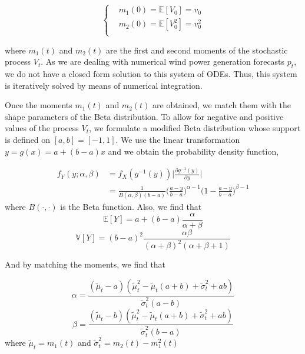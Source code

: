 \documentclass[10pt,twocolumn,letterpaper]{article}
\newcommand{\E}{\mathbb{E}}
\newcommand{\V}{\mathbb{V}}
\begin{document}
\begin{equation}
\begin{cases}
&m_1(0)=\E[V_0]= v_0 \\
&m_2(0)=\E[V_0^2] = v_0^2 \\
\end{cases}
\end{equation}

where $m_1(t)$ and $m_2(t)$ are the first and second moments of the stochastic process $V_t$. As we are dealing with numerical wind power generation forecasts $p_t$, we do not have a closed form solution to this system of ODEs. Thus, this system is iteratively solved by means of numerical integration.

Once the moments $m_1(t)$ and $m_2(t)$ are obtained, we match them with the shape parameters of the Beta distribution. To allow for negative and positive values of the process $V_t$, we formulate a modified Beta distribution whose support is defined on $[a,b]=[-1,1]$.  We use the linear transformation $y= g(x)= a + (b-a) x $ and we obtain the probability density function,

\begin{equation}
\begin{split}
f_Y(y; \alpha , \beta )&= f_X(g^{-1}(y) ) \Big| \frac{\partial g^{-1}(y)}{\partial y }  \Big| \\
&= \frac{1}{B(\alpha, \beta) (b-a)} \Big(\frac{a-y}{b-a}\Big)^{\alpha -1}\Big(1-\frac{a-y}{b-a} \Big)^{\beta -1} \label{modified_Beta}
\end{split}
\end{equation}
where $B(\cdot,\cdot)$ is the Beta function. Also, we find that
\begin{equation}
\E[Y]= a + (b-a) \frac{\alpha}{\alpha + \beta}
\end{equation}
\begin{equation}
\V[Y]= (b-a)^2 \frac{\alpha \beta}{(\alpha + \beta)^2 (\alpha + \beta + 1)}
\end{equation}

And by matching the moments, we find that 

\begin{equation}
\alpha = \frac{(\tilde{\mu}_t-a) \left(\tilde{\mu}_t^2-\tilde{\mu}_t (a+b)+\tilde{\sigma}_t^2+a b\right)}{\tilde{\sigma}_t^2 (a-b)}
\end{equation}
\begin{equation}
\beta = \frac{(\tilde{\mu}_t-b) \left(\tilde{\mu}_t^2-\tilde{\mu}_t (a+b)+\tilde{\sigma}_t^2+a b\right)}{\tilde{\sigma}_t^2 (b-a)}
\end{equation}
where $\tilde{\mu}_t = m_1(t)$ and $\tilde{\sigma}_t^2= m_2(t)- m_1^2(t)$
\end{document}
